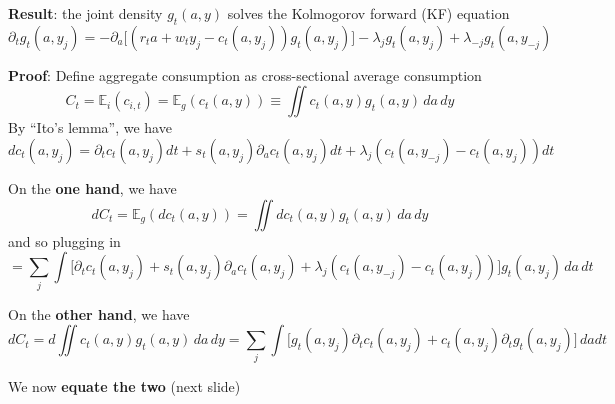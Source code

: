 \documentclass[11pt, aspectratio=169]{beamer}
\begin{document}
\begin{frame}{}

\vspace{4mm}
{\color{blue} \textbf{Result}}: the joint density $g_t(a, y)$ solves the Kolmogorov forward (KF) equation
\begin{equation*}
	\partial_t g_t(a, y_j) = -\partial_a \Big[ (r_t a + w_t y_j - c_t(a, y_j)) g_t(a, y_j) \Big] - \lambda_j g_t(a, y_j) + \lambda_{-j} g_t(a, y_{-j}) 
\end{equation*}


\vspace{6mm}
\textbf{Proof}:
Define aggregate consumption as cross-sectional average consumption
\begin{equation*}
	C_t = \mathbb E_i (c_{i, t}) = \mathbb E_g(c_t(a, y)) \equiv \iint c_t(a, y) g_t(a, y) \, da \, dy
\end{equation*}
By ``Ito's lemma'', we have 
\begin{equation*}
	d c_t(a, y_j) = \partial_t c_t(a, y_j) dt + s_t(a, y_j) \partial_a c_t(a, y_j) dt + \lambda_j (c_t(a, y_{-j}) - c_t(a, y_j)) dt 
\end{equation*}
\end{frame}


\begin{frame}{}
On the \textbf{one hand}, we have
\begin{equation*}
	d C_t = \mathbb E_g(dc_t(a, y)) = \iint d c_t(a, y) g_t(a, y) \, da \, dy
\end{equation*}
and so plugging in 
\begin{equation*}
	= \sum_j \int \bigg[ \partial_t c_t(a, y_j) + s_t(a, y_j) \partial_a c_t(a, y_j) + \lambda_j (c_t(a, y_{-j}) - c_t(a, y_j)) \bigg] g_t(a, y_j) \, da \, dt
\end{equation*}


\vspace{4mm}
On the \textbf{other hand}, we have
\begin{equation*}
	d C_t = d \iint c_t(a, y) g_t(a, y) \, da \, dy = \sum_j \int \bigg[ g_t(a, y_j) \partial_t c_t (a, y_j) + c_t(a, y_j) \partial_t g_t(a, y_j) \bigg] \, da dt
\end{equation*}


\vspace{4mm}
We now \textbf{equate the two} (next slide)
\end{frame} 
\end{document}
